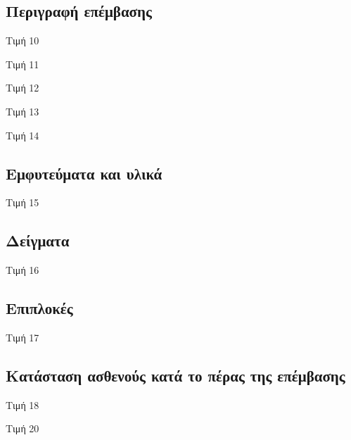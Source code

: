 \documentclass[10pt,greek]{article}
\begin{document}
\begin{PatientInfo}
\end{PatientInfo}

\subsection*{Περιγραφή επέμβασης}
Τιμή 10

Τιμή 11

Τιμή 12

Τιμή 13

Τιμή 14

\subsection*{Εμφυτεύματα και υλικά}
Τιμή 15

\subsection*{Δείγματα}
Τιμή 16

\subsection*{Επιπλοκές}
Τιμή 17

\subsection*{Κατάσταση ασθενούς κατά το πέρας της επέμβασης}
Τιμή 18

\vspace{2em}
\newline
Τιμή 20
\end{document}
